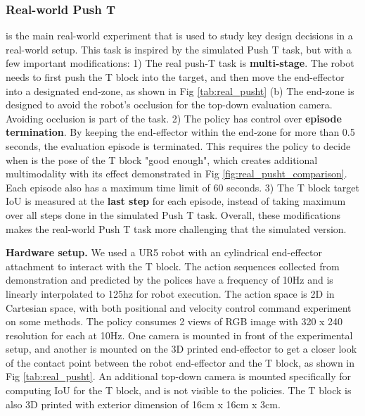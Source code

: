 \subsubsection{\textbf{Real-world Push T}}
is the main real-world experiment that is used to study key design decisions in a real-world setup.  This task is inspired by the simulated Push T task, but with a few important modifications: 1) The real push-T  task is \textbf{multi-stage}. The robot needs to first push the T block into the target, and then move the end-effector into a designated end-zone, as shown in Fig \ref{tab:real_pusht} (b) The end-zone is designed to avoid the robot's occlusion for the top-down evaluation camera. Avoiding occlusion is part of the task. 2) The policy has control over \textbf{episode termination}. By keeping the end-effector within the end-zone for more than 0.5 seconds, the evaluation episode is terminated. This requires the policy to decide when is the pose of the T block "good enough", which creates additional multimodality with its effect demonstrated in Fig \ref{fig:real_pusht_comparison}. Each episode also has a maximum time limit of 60 seconds. 3) The T block target IoU is measured at the \textbf{last step} for each episode, instead of taking maximum over all steps done in the simulated Push T task. Overall, these modifications makes the real-world Push T task more challenging that the simulated version.

\textbf{Hardware setup.} We used a UR5 robot with an cylindrical end-effector attachment to interact with the T block. The action sequences collected from demonstration and predicted by the polices have a frequency of 10Hz and is linearly interpolated to 125hz for robot execution. The action space is 2D in Cartesian space, with both positional and velocity control command experiment on some methods. The policy consumes 2 views of RGB image with 320 x 240 resolution for each at 10Hz. One camera is mounted in front of the experimental setup, and another is mounted on the 3D printed end-effector to get a closer look of the contact point between the robot end-effector and the T block, as shown in Fig \ref{tab:real_pusht}. An additional top-down camera is mounted specifically for computing IoU for the T block, and is not visible to the policies. The T block is also 3D printed with exterior dimension of 16cm x 16cm x 3cm.

